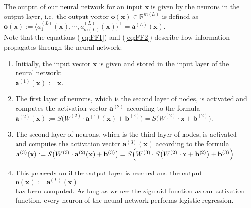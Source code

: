 The output of our neural network for an input $\mathbf{x}$ is given by the neurons in the output
layer,  i.e.~the output vector 
$\mathbf{o}(\mathbf{x}) \in \mathbb{R}^{m(L)}$ is defined as 
\\[0.2cm]
\hspace*{1.3cm}
$\mathbf{o}(\mathbf{x}) :=
 \bigl\langle a^{(L)}_1(\mathbf{x}), \cdots, a^{(L)}_{m(L)}(\mathbf{x}) \bigr\rangle^\top = \mathbf{a}^{(L)}(\mathbf{x})$.
\\[0.2cm]
Note that the equations (\ref{eq:FF1}) and (\ref{eq:FF2}) describe how information propagates
through the neural network: 
\begin{enumerate}
\item Initially, the input vector $\mathbf{x}$ is given and stored in the input layer of the neural network:
      \\[0.2cm]
      \hspace*{1.3cm}
      $\mathbf{a}^{(1)}(\mathbf{x}) := \mathbf{x}$.
\item The first layer of neurons, which is the second layer of nodes,  is activated and computes the activation
      vector $\mathbf{a}^{(2)}$ according to the formula
      \\[0.2cm]
      \hspace*{1.3cm}
      $\mathbf{a}^{(2)}(\mathbf{x}) := S\bigl(W^{(2)} \cdot \mathbf{a}^{(1)}(\mathbf{x}) + \mathbf{b}^{(2)}\bigr) = 
                                        S\bigl(W^{(2)} \cdot \mathbf{x} + \mathbf{b}^{(2)}\bigr)
      $.
\item The second layer of neurons, which is the third layer of nodes,  is activated and computes the activation
      vector $\mathbf{a}^{(3)}(\mathbf{x})$ according to the formula
      \\[0.2cm]
      \hspace*{1.3cm}
      $\mathbf{a}^{(3)}(\mathbf{x}) := S\bigl(W^{(3)} \cdot \mathbf{a}^{(2)}(\mathbf{x}) + \mathbf{b}^{(3)}\bigr)
                          = S\Bigl(W^{(3)} \cdot S\bigl(W^{(2)} \cdot \mathbf{x} + \mathbf{b}^{(2)}\bigr) + \mathbf{b}^{(3)}\Bigr)
        $
\item This proceeds until the output layer is reached and the output
      \\[0.2cm]
      \hspace*{1.3cm}
      $\mathbf{o}(\mathbf{x}) := \mathbf{a}^{(L)}(\mathbf{x})$
      \\[0.2cm]
      has been computed.  As long as we use the sigmoid function as our activation function, every neuron of
      the neural network performs logistic regression. 
\end{enumerate}

